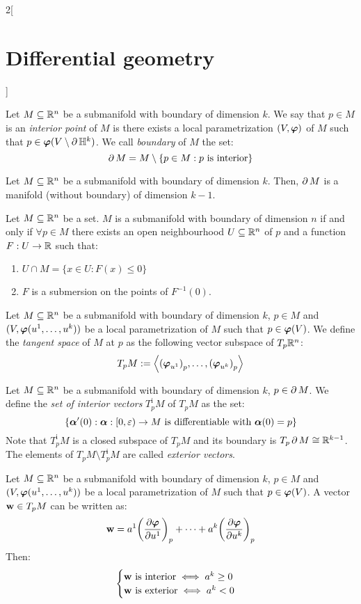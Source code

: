 \documentclass[../../../main.tex]{subfiles}
\begin{document}
\begin{multicols}{2}[\section{Differential geometry}]
\begin{lemma}
  \end{lemma}
  \begin{definition}
    Let $M\subseteq\mathbb{R}^n$ be a submanifold with boundary of dimension $k$. We say that $p\in M$ is an \emph{interior point} of $M$ is there exists a local parametrization $(V,\boldsymbol{\mathrm{\varphi}})$ of $M$ such that $p\in\boldsymbol{\mathrm{\varphi}}(V\setminus\operatorname{\partial}{\mathbb{H}^k})$. We call \emph{boundary} of $M$ the set: $$\operatorname{\partial}{M}=M\setminus\{p\in M:p\text{ is interior}\}$$
  \end{definition}
  \begin{proposition}
    Let $M\subseteq\mathbb{R}^n$ be a submanifold with boundary of dimension $k$. Then, $\operatorname{\partial}{M}$ is a manifold (without boundary) of dimension $k-1$.
  \end{proposition}
  \begin{proposition}
    Let $M\subseteq\mathbb{R}^n$ be a set. $M$ is a submanifold with boundary of dimension $n$ if and only if $\forall p\in M$ there exists an open neighbourhood $U\subseteq \mathbb{R}^n$ of $p$ and a function $F:U\rightarrow\mathbb{R}$ such that:
    \begin{enumerate}
      \item $U\cap M=\{x\in U:F(x)\leq 0\}$
      \item $F$ is a submersion on the points of $F^{-1}(0)$.
    \end{enumerate}
  \end{proposition}
  \begin{definition}
    Let $M\subseteq\mathbb{R}^n$ be a submanifold with boundary of dimension $k$, $p\in M$ and $(V,\boldsymbol{\mathrm{\varphi}}(u^1,\ldots,u^k))$ be a local parametrization of $M$ such that $p\in\boldsymbol{\mathrm{\varphi}}(V)$. We define the \emph{tangent space} of $M$ at $p$ as the following vector subspace of $T_p\mathbb{R}^n$: $$T_pM:=\left\langle{\left(\boldsymbol{\mathrm{\varphi}}_{u^1}\right)}_p,\ldots,{\left(\boldsymbol{\mathrm{\varphi}}_{u^k}\right)}_p\right\rangle$$
  \end{definition}
  \begin{definition}
    Let $M\subseteq\mathbb{R}^n$ be a submanifold with boundary of dimension $k$, $p\in \operatorname{\partial}{M}$. We define the \emph{set of interior vectors} $T_p^\text{i}M$ of $T_pM$ as the set:
    $$\{\boldsymbol{\mathrm{\alpha}}'(0):\boldsymbol{\mathrm{\alpha}}:[0,\varepsilon)\rightarrow M\text{ is differentiable with }\boldsymbol{\mathrm{\alpha}}(0)=p\}$$
    Note that $T_p^\text{i}M$ is a closed subspace of $T_pM$ and its boundary is $T_p\operatorname{\partial}{M}\cong\mathbb{R}^{k-1}$.
    The elements of $T_pM\setminus T_p^\text{i}M$ are called \emph{exterior vectors}.
  \end{definition}
  \begin{lemma}
    Let $M\subseteq\mathbb{R}^n$ be a submanifold with boundary of dimension $k$, $p\in M$ and $(V,\boldsymbol{\mathrm{\varphi}}(u^1,\ldots,u^k))$ be a local parametrization of $M$ such that $p\in\boldsymbol{\mathrm{\varphi}}(V)$. A vector $\boldsymbol{\mathrm{w}}\in T_pM$ can be written as: $$\boldsymbol{\mathrm{w}}=a^1{\left(\pdv{\boldsymbol{\mathrm{\varphi}}}{u^1}\right)}_p+\cdots+a^k{\left(\pdv{\boldsymbol{\mathrm{\varphi}}}{u^k}\right)}_p$$ Then:
    $$
      \begin{cases}
        \boldsymbol{\mathrm{w}}\text{ is interior}\iff a^k\geq 0 \\
        \boldsymbol{\mathrm{w}}\text{ is exterior}\iff a^k< 0    \\
      \end{cases}
    $$
  \end{lemma}

\end{multicols}
\end{document}
